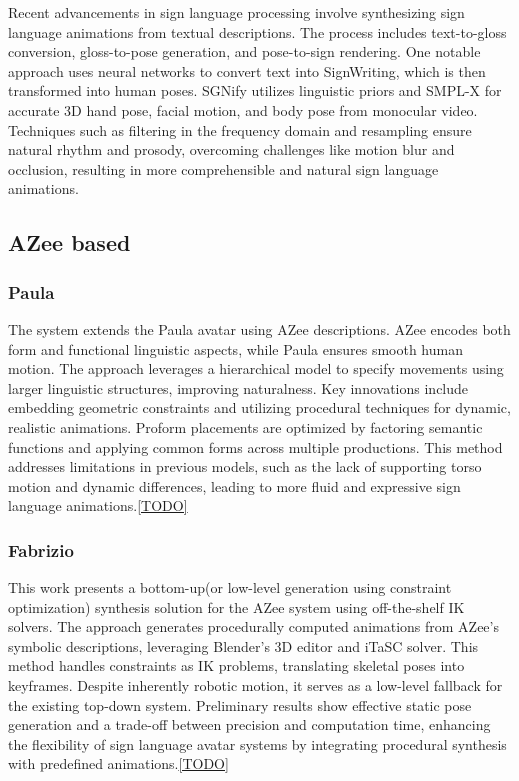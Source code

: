\documentclass[../../main.tex]{subfiles}
\begin{document}
Recent advancements in sign language processing involve synthesizing sign language animations from textual descriptions. The process includes text-to-gloss conversion, gloss-to-pose generation, and pose-to-sign rendering. One notable approach uses neural networks to convert text into SignWriting, which is then transformed into human poses. SGNify utilizes linguistic priors and SMPL-X for accurate 3D hand pose, facial motion, and body pose from monocular video. Techniques such as filtering in the frequency domain and resampling ensure natural rhythm and prosody, overcoming challenges like motion blur and occlusion, resulting in more comprehensible and natural sign language animations.

\subsection{AZee based}

\subsubsection{Paula}

The system extends the Paula\cite{TODO} avatar using AZee descriptions. AZee encodes both form and functional linguistic aspects, while Paula ensures smooth human motion. The approach leverages a hierarchical model to specify movements using larger linguistic structures, improving naturalness. Key innovations include embedding geometric constraints and utilizing procedural techniques for dynamic, realistic animations. Proform placements are optimized by factoring semantic functions and applying common forms across multiple productions. This method addresses limitations in previous models, such as the lack of supporting torso motion and dynamic differences, leading to more fluid and expressive sign language animations.\ref{TODO}

\subsubsection{Fabrizio}

This work presents a bottom-up(or low-level generation using constraint optimization) synthesis solution for the AZee system using off-the-shelf IK solvers. The approach generates procedurally computed animations from AZee's symbolic descriptions, leveraging Blender's 3D editor and iTaSC solver. This method handles constraints as IK problems, translating skeletal poses into keyframes. Despite inherently robotic motion, it serves as a low-level fallback for the existing top-down system. Preliminary results show effective static pose generation and a trade-off between precision and computation time, enhancing the flexibility of sign language avatar systems by integrating procedural synthesis with predefined animations.\ref{TODO}
\end{document}
